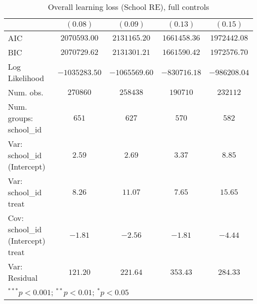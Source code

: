 \begin{table}
\begin{center}
\begin{tabular}{l c c c c}
                                  & $(0.08)$      & $(0.09)$      & $(0.13)$      & $(0.15)$      \\
\hline
AIC                               & $2070593.00$  & $2131165.20$  & $1661458.36$  & $1972442.08$  \\
BIC                               & $2070729.62$  & $2131301.21$  & $1661590.42$  & $1972576.70$  \\
Log Likelihood                    & $-1035283.50$ & $-1065569.60$ & $-830716.18$  & $-986208.04$  \\
Num. obs.                         & $270860$      & $258438$      & $190710$      & $232112$      \\
Num. groups: school\_id           & $651$         & $627$         & $570$         & $582$         \\
Var: school\_id (Intercept)       & $2.59$        & $2.69$        & $3.37$        & $8.85$        \\
Var: school\_id treat             & $8.26$        & $11.07$       & $7.65$        & $15.65$       \\
Cov: school\_id (Intercept) treat & $-1.81$       & $-2.56$       & $-1.81$       & $-4.44$       \\
Var: Residual                     & $121.20$      & $221.64$      & $353.43$      & $284.33$      \\
\hline
\multicolumn{5}{l}{\scriptsize{$^{***}p<0.001$; $^{**}p<0.01$; $^{*}p<0.05$}}
\end{tabular}
\caption{Overall learning loss (School RE), full controls}
\label{table:school_re_controls}
\end{center}
\end{table}
